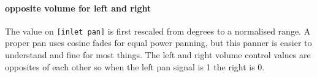 \paragraph{opposite volume for left and right}
The value on \verb+[inlet pan]+
is first rescaled from degrees to a normalised range.
A proper pan uses cosine fades for equal power panning, but this 
panner is easier to understand and fine for most things. The left and
right volume control values are opposites of each other so when
the left pan signal is 1 the right is 0. 